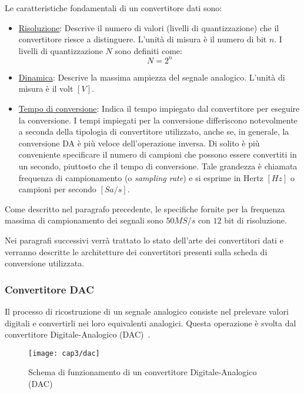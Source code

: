 Le caratteristiche fondamentali di un convertitore dati sono:
\begin{itemize}
	\item \underline{Risoluzione}: Descrive il numero di valori (livelli di quantizzazione) che il convertitore riesce a distinguere. L'unità di misura è il numero di bit $n$. I livelli di quantizzazione $N$ sono definiti come:
	\begin{equation}
		N=2^n
	\end{equation}
	\item \underline{Dinamica}: Descrive la massima ampiezza del segnale analogico. L'unità di misura è il volt $[V]$.
	\item \underline{Tempo di conversione}: Indica il tempo impiegato dal convertitore per eseguire la conversione. I tempi impiegati per la conversione differiscono notevolmente a seconda della tipologia di convertitore utilizzato, anche se, in generale, la conversione DA è più veloce dell'operazione inversa. Di solito è più conveniente specificare il numero di campioni che possono essere convertiti in un secondo, piuttosto che il tempo di conversione. Tale grandezza è chiamata frequenza di campionamento (o \textit{sampling rate}) e si esprime in Hertz $[Hz]$ o campioni per secondo $[Sa/s]$.
\end{itemize}

Come descritto nel paragrafo precedente, le specifiche fornite per la frequenza massima di campionamento dei segnali sono $50MS/s$ con $12$ bit di risoluzione.

Nei paragrafi successivi verrà trattato lo stato dell'arte dei convertitori dati e verranno descritte le architetture dei convertitori presenti sulla scheda di conversione utilizzata.

\subsubsection{Convertitore DAC}
Il processo di ricostruzione di un segnale analogico consiste nel prelevare valori digitali e convertirli nei loro equivalenti analogici. Questa operazione è svolta dal convertitore Digitale-Analogico (DAC)~\cite{storeyelet}.

\begin{figure}  
  \begin{center}
    \texttt{[image: cap3/dac]}
    \caption{Schema di funzionamento di un convertitore Digitale-Analogico (DAC)}
    \label{dac}
  \end{center}
\end{figure}

